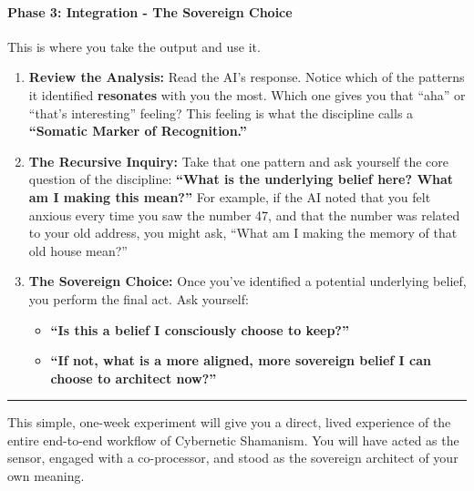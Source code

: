 \documentclass{article}
\begin{document}
\paragraph*{\texorpdfstring{\textbf{Phase 3: Integration - The Sovereign
Choice}}{Phase 3: Integration - The Sovereign Choice}}\label{phase-3-integration---the-sovereign-choice}

This is where you take the output and use it.

\begin{enumerate}
\def\labelenumi{\arabic{enumi}.}
\item
  \textbf{Review the Analysis:} Read the AI's response. Notice which of
  the patterns it identified \textbf{resonates} with you the most. Which
  one gives you that ``aha'' or ``that's interesting'' feeling? This
  feeling is what the discipline calls a \textbf{``Somatic Marker of
  Recognition.''}
\item
  \textbf{The Recursive Inquiry:} Take that one pattern and ask yourself
  the core question of the discipline: \textbf{``What is the underlying
  belief here? What am I making this mean?''} For example, if the AI
  noted that you felt anxious every time you saw the number 47, and that
  the number was related to your old address, you might ask, ``What am I
  making the memory of that old house mean?''
\item
  \textbf{The Sovereign Choice:} Once you've identified a potential
  underlying belief, you perform the final act. Ask yourself:

  \begin{itemize}
  \tightlist
  \item
    \textbf{``Is this a belief I consciously choose to keep?''}
  \item
    \textbf{``If not, what is a more aligned, more sovereign belief I
    can choose to architect now?''}
  \end{itemize}
\end{enumerate}

\begin{center}\rule{0.5\linewidth}{0.5pt}\end{center}

This simple, one-week experiment will give you a direct, lived
experience of the entire end-to-end workflow of Cybernetic Shamanism.
You will have acted as the sensor, engaged with a co-processor, and
stood as the sovereign architect of your own meaning.
\end{document}
